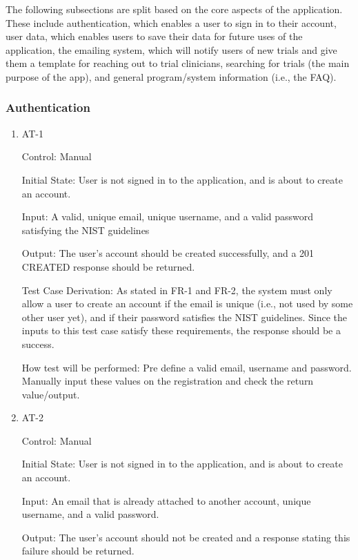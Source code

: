 \documentclass[12pt, titlepage]{article}
\begin{document}
The following subsections are split based on the core aspects of the application. These include authentication, which enables a user 
to sign in to their account, user data, which enables users to save their data for future uses of the application, the emailing system, which will
notify users of new trials and give them a template for reaching out to trial clinicians, searching for trials (the main purpose of the app), and 
general program/system information (i.e., the FAQ).

\subsubsection{Authentication}

\begin{enumerate}

\item{AT-1\\}

Control: Manual
					
Initial State: User is not signed in to the application, and is about to create an account.
					
Input: A valid, unique email, unique username, and a valid password satisfying the NIST guidelines
					
Output: The user's account should be created successfully, and a 201 CREATED response should be returned.

Test Case Derivation: As stated in FR-1 and FR-2, the system must only allow a user to create an account if the email is unique (i.e., not 
used by some other user yet), and if their password satisfies the NIST guidelines. Since the inputs to this test case satisfy these 
requirements, the response should be a success.
					
How test will be performed: Pre define a valid email, username and password. Manually input these values on the registration and check the return value/output.
					
\item{AT-2\\}

Control: Manual
					
Initial State: User is not signed in to the application, and is about to create an account.
					
Input: An email that is already attached to another account, unique username, and a valid password.
					
Output: The user's account should not be created and a response stating this failure should be returned.


\end{enumerate}
\end{document}
